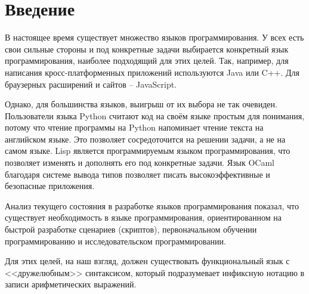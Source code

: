 \section*{Введение}
    В настоящее время существует множество языков программирования.
    У всех есть свои сильные стороны и под конкретные задачи выбирается конкретный язык программирования, наиболее подходящий для этих целей.
    Так, например, для написания кросс-платформенных приложений используются Java или C++.\cite{p_c_lisp}
    Для браузерных расширений и сайтов -- JavaScript.

    Однако, для большинства языков, выигрыш от их выбора не так очевиден.
    Пользователи языка Python считают код на своём языке простым для понимания, потому что чтение программы на Python напоминает чтение текста на английском языке.
    Это позволяет сосредоточится на решении задачи, а не на самом языке.
    Lisp является программируемым языком программирования, что позволяет изменять и дополнять его под конкретные задачи.
    Язык OCaml благодаря системе вывода типов позволяет писать высокоэффективные и безопасные приложения.

    Анализ текущего состояния в разработке языков программирования показал, что существует необходимость в языке программирования, ориентированном на быстрой разработке сценариев (скриптов), первоначальном обучении программированию и исследовательском программировании.

    Для этих целей, на наш взгляд, должен существовать функциональный язык с <<дружелюбным>> синтаксисом, который подразумевает инфиксную нотацию в записи арифметических выражений.
